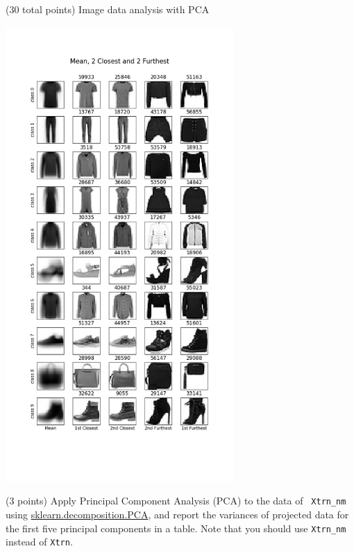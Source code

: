 \documentclass[12pt]{article}
\begin{document}
\begin{question}{(30 total points) Image data analysis with PCA}
\begin{subquestion}
  \begin{answerbox}{52em}
    \begin{center}
        \includegraphics[width=0.65\textwidth]{results/1_2.png}
    \end{center}
  \end{answerbox}



   \end{subquestion}

   \begin{subquestion}{(3 points)
       Apply Principal Component Analysis (PCA) to the data of {\tt
         Xtrn\_nm} using
       \href{https://scikit-learn.org/0.19/modules/generated/sklearn.decomposition.PCA.html}{sklearn.decomposition.PCA},
       and report the variances of projected data for the first five principal
       components in a table. Note that you should use {\tt Xtrn\_nm} instead of {\tt Xtrn}.} 
    \label{Q1.pca.variance}
     



\end{subquestion}
\end{question}
\end{document}
